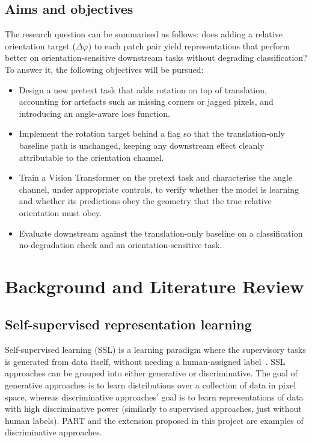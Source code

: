 \documentclass[11pt,a4paper]{report}
\begin{document}
\section{Aims and objectives}
The research question can be summarised as follows: does adding a relative orientation target ($\Delta \varphi$) to each patch pair yield representations that perform better on orientation-sensitive downstream tasks without degrading classification? To answer it, the following objectives will be pursued:
\begin{itemize}
    \item Design a new pretext task that adds rotation on top of translation, accounting for artefacts such as missing corners or jagged pixels, and introducing an angle-aware loss function.
    \item Implement the rotation target behind a flag so that the translation-only baseline path is unchanged, keeping any downstream effect cleanly attributable to the orientation channel.
    \item Train a Vision Transformer on the pretext task and characterise the angle channel, under appropriate controls, to verify whether the model is learning and whether its predictions obey the geometry that the true relative orientation must obey.
    \item Evaluate downstream against the translation-only baseline on a classification no-degradation check and an orientation-sensitive task.
\end{itemize}

\chapter{Background and Literature Review}


\section{Self-supervised representation learning}
Self-supervised learning (SSL) is a learning paradigm where the supervisory tasks is generated from data itself, without needing a human-assigned label~\cite{sslsurvey}. SSL approaches can be grouped into either generative or discriminative. The goal of generative approaches is to learn distributions over a collection of data in pixel space, whereas discriminative approaches' goal is to learn representations of data with high discriminative power (similarly to supervised approaches, just without human labels). PART and the extension proposed in this project are examples of discriminative approaches.
\end{document}
